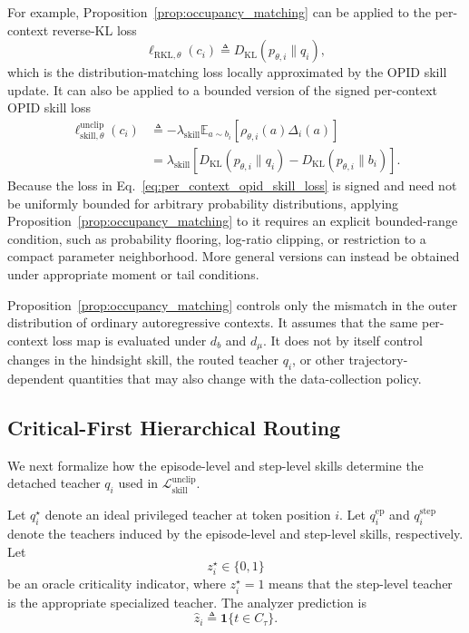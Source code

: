 \documentclass{llmxive}
\begin{document}
For example, Proposition~\ref{prop:occupancy_matching} can be applied to
the per-context reverse-KL loss
\begin{equation*}
 \ell_{\mathrm{RKL},\theta}(c_i)
 \triangleq
 D_{\mathrm{KL}}
 \left(
   p_{\theta,i}\|q_i
 \right),
\end{equation*}
which is the distribution-matching loss locally approximated by the OPID
skill update. It can also be applied to a bounded version of the signed
per-context OPID skill loss
\begin{equation}
\begin{aligned}
 \ell_{\mathrm{skill},\theta}^{\mathrm{unclip}}(c_i)
 &\triangleq
 -
 \lambda_{\mathrm{skill}}
 \mathbb E_{a\sim b_i}
 \left[
   \rho_{\theta,i}(a)\Delta_i(a)
 \right]
 \\
 &=
 \lambda_{\mathrm{skill}}
 \left[
   D_{\mathrm{KL}}
   \left(
     p_{\theta,i}\|q_i
   \right)
   -
   D_{\mathrm{KL}}
   \left(
     p_{\theta,i}\|b_i
   \right)
 \right].
\end{aligned}
\label{eq:per_context_opid_skill_loss}
\end{equation}
Because the loss in Eq.~\ref{eq:per_context_opid_skill_loss} is signed
and need not be uniformly bounded for arbitrary probability distributions,
applying Proposition~\ref{prop:occupancy_matching} to it requires an
explicit bounded-range condition, such as probability flooring, log-ratio
clipping, or restriction to a compact parameter neighborhood. More general
versions can instead be obtained under appropriate moment or tail
conditions.

Proposition~\ref{prop:occupancy_matching} controls only the mismatch in the
outer distribution of ordinary autoregressive contexts. It assumes that
the same per-context loss map is evaluated under \(d_b\) and \(d_\mu\).
It does not by itself control changes in the hindsight skill, the routed
teacher \(q_i\), or other trajectory-dependent quantities that may also
change with the data-collection policy.
\subsection{Critical-First Hierarchical Routing}
\label{app:routing}

We next formalize how the episode-level and step-level skills determine the
detached teacher \(q_i\) used in
\(\mathcal L_{\mathrm{skill}}^{\mathrm{unclip}}\).

Let \(q_i^\star\) denote an ideal privileged teacher at token position
\(i\). Let \(q_i^{\mathrm{ep}}\) and \(q_i^{\mathrm{step}}\) denote the
teachers induced by the episode-level and step-level skills, respectively.
Let
\begin{equation*}
 z_i^\star\in\{0,1\}
\end{equation*}
be an oracle criticality indicator, where \(z_i^\star=1\) means that the
step-level teacher is the appropriate specialized teacher. The analyzer
prediction is
\begin{equation*}
 \widehat z_i
 \triangleq
 \mathbf 1\{t\in C_\tau\}.
\end{equation*}
\end{document}
